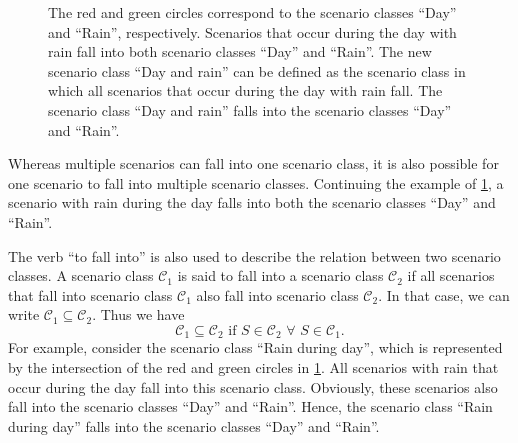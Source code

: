 \setlength{\venncircle}{7em}
\begin{figure}
	\centering
	\caption{The red and green circles correspond to the scenario classes ``Day'' and ``Rain'', respectively. Scenarios that occur during the day with rain fall into both scenario classes ``Day'' and ``Rain''. The new scenario class ``Day and rain'' can be defined as the scenario class in which all scenarios that occur during the day with rain fall. The scenario class ``Day and rain'' falls into the scenario classes ``Day'' and ``Rain''.}
	\label{fig:venn diagram scenario class}
\end{figure}

Whereas multiple scenarios can fall into one scenario class, it is also possible for one scenario to fall into multiple scenario classes. Continuing the example of \cref{fig:venn diagram scenario class}, a scenario with rain during the day falls into both the scenario classes ``Day'' and ``Rain''.

The verb ``to fall into'' is also used to describe the relation between two scenario classes. A scenario class $\mathcal{C}_1$ is said to fall into a scenario class $\mathcal{C}_2$ if all scenarios that fall into scenario class $\mathcal{C}_1$ also fall into scenario class $\mathcal{C}_2$. In that case, we can write $\mathcal{C}_1 \subseteq \mathcal{C}_2$. Thus we have
\begin{equation}
	\mathcal{C}_1 \subseteq \mathcal{C}_2 \text{ if } S \in \mathcal{C}_2 \,\,\forall\,\, S \in \mathcal{C}_1.
\end{equation}
For example, consider the scenario class ``Rain during day'', which is represented by the intersection of the red and green circles in \cref{fig:venn diagram scenario class}. All scenarios with rain that occur during the day fall into this scenario class. Obviously, these scenarios also fall into the scenario classes ``Day'' and ``Rain''. Hence, the scenario class ``Rain during day'' falls into the scenario classes ``Day'' and ``Rain''.

